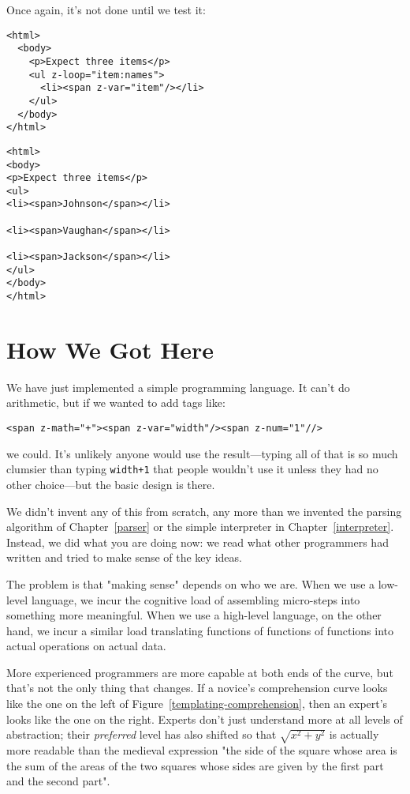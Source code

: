 \documentclass{scrbook}
\newcommand{\chapref}[1]{Chapter~\ref{#1}}
\newcommand{\figref}[1]{Figure~\ref{#1}}
\begin{document}
Once again,
it's not done until we test it:


\begin{lstlisting}[frame=single,frameround=tttt]
<html>
  <body>
    <p>Expect three items</p>
    <ul z-loop="item:names">
      <li><span z-var="item"/></li>
    </ul>
  </body>
</html>
\end{lstlisting}



\begin{lstlisting}[frame=single,frameround=tttt]
<html>
<body>
<p>Expect three items</p>
<ul>
<li><span>Johnson</span></li>

<li><span>Vaughan</span></li>

<li><span>Jackson</span></li>
</ul>
</body>
</html>
\end{lstlisting}


\section{How We Got Here}\label{templating-learning}


We have just implemented a simple programming language.
It can't do arithmetic,
but if we wanted to add tags like:

\begin{lstlisting}[frame=single,frameround=tttt]
<span z-math="+"><span z-var="width"/><span z-num="1"//>
\end{lstlisting}


\noindent we could.
It's unlikely anyone would use the result—typing all of that
is so much clumsier than typing \texttt{width+1} that people wouldn't use it
unless they had no other choice—but the basic design is there.


We didn't invent any of this from scratch,
any more than we invented the parsing algorithm of \chapref{parser}
or the simple interpreter in \chapref{interpreter}.
Instead,
we did what you are doing now:
we read what other programmers had written
and tried to make sense of the key ideas.


The problem is that "making sense" depends on who we are.
When we use a low-level language,
we incur the cognitive load of assembling micro-steps into something more meaningful.
When we use a high-level language,
on the other hand,
we incur a similar load translating functions of functions of functions
into actual operations on actual data.


More experienced programmers are more capable at both ends of the curve,
but that's not the only thing that changes.
If a novice's comprehension curve looks like the one on the left
of \figref{templating-comprehension},
then an expert's looks like the one on the right.
Experts don't just understand more at all levels of abstraction;
their \emph{preferred} level has also shifted
so that $\sqrt{x^2 + y^2}$
is actually more readable than the medieval expression
"the side of the square whose area is the sum of the areas of the two squares
whose sides are given by the first part and the second part".
\end{document}
